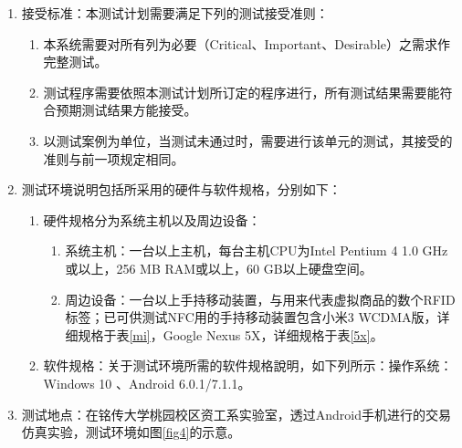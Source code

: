 	 		\begin{enumerate}
	 			
	 			\item 接受标准：本测试计划需要满足下列的测试接受准则： 

	 			\begin{enumerate}
					\item 本系统需要对所有列为必要（Critical、Important、Desirable）之需求作完整测试。
					\item 测试程序需要依照本测试计划所订定的程序进行，所有测试结果需要能符合预期测试结果方能接受。
					\item 以测试案例为单位，当测试未通过时，需要进行该单元的测试，其接受的准则与前一项规定相同。 
				\end{enumerate}

				\item 测试环境说明包括所采用的硬件与软件规格，分别如下：
				\begin{enumerate}
					\item 硬件规格分为系统主机以及周边设备：
					
					\begin{enumerate}
						\item 系统主机：一台以上主机，每台主机CPU为Intel Pentium 4 1.0 GHz或以上，256 MB RAM或以上，60 GB以上硬盘空间。
						\item 周边设备：一台以上手持移动装置，与用来代表虚拟商品的数个RFID标签；已可供测试NFC用的手持移动装置包含小米3 WCDMA版，详细规格于表\ref{mi}，Google Nexus 5X，详细规格于表\ref{5x}。
					
					\end{enumerate}
					\item 软件规格：关于测试环境所需的软件规格說明，如下列所示：操作系统：Windows 10 、Android 6.0.1/7.1.1。

				\end{enumerate}
				\item 测试地点：在铭传大学桃园校区资工系实验室，透过Android手机进行的交易仿真实验，测试环境如图\ref{fig4}的示意。

	 	


\end{enumerate}
